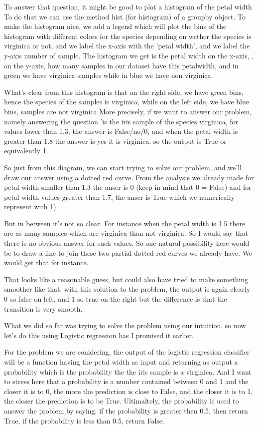 \documentclass{article}
\begin{document}
To answer that question, it might be good to plot a histogram of the petal width
To do that we can use the method hist (for histogram) of a groupby object.
To make the histogram nice,  we add a legend which 
will plot the bins of the histogram with different colors
for the species depending on wether the species is virginica or not, 
and we label the x-axis with the 'petal width', 
and we label the y-axis number of sample.
The histogram we get is the petal width on the x-axis,
, on the y-axis, how many samples in our dataset have this petalwidth, and in green we have virginica samples while in blue we have non virginica.

What's clear from this histogram is that on the right side, 
we have green bins, hence
the species of the samples is virginica, 
while on the left side, we have blue bins, 
samples are not virginica
More precisely, if we want to answer our problem, 
namely answering the question 
'is the iris sample of the species virginica, for values lower than 
1.3, the answer is False/no/0,
and when the petal width is greater than 1.8 the answer is yes it is virginica,
so the output is True or equivalently 1.

So just from this diagram, we can start trying to solve our problem, and we'll draw our answer using a dotted 
red curve.
From the analysis we already made 
for petal width smaller than 1.3 the anser is 0 
(keep in mind that 0 = False)
and for petal width values greater than 1.7, 
the anser is True which we numerically represent with 1).

But in between it's not so clear.
For instance when the petal width is 1.5 there are as many samples which are virginica than not virginica.
So I would say that there is no obvious answer for such values.
So one natural possibility here would be to draw a line to join these two partial dotted red curves we already have.
We would get that for instance. 

That looks like a reasonable guess, but could also have tried to make something smoother like that: 
with this solution to the problem,  the 
output is again clearly 0 so false on left, and 1 so true on the right but the difference is that the transition is very smooth.

What we did so far was trying to solve the problem using our intuition, so now let's do this using Logistic regression has I promised it earlier.

For the problem we are conidering, the output of the logistic regression classifier will be a function having the petal width as input and returning as output a probability
which is the probability the the iris sample is a virginica.
And I want to stress here that a probability is a number contained between 0 and 1 and the closer it is to 0, the more the prediction is close to False, and the closer it is to 1, the closer the prediction is to be True.
Ultimaltely, the probability is used to answer the problem by saying: 
if the probability is greater then 0.5, then return True, if the probability is less than 0.5, return False.
\end{document}
